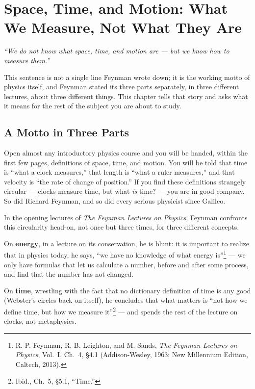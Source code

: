 \documentclass[12pt]{book}
\begin{document}
\chapter[Space, Time, and Motion]{Space, Time, and Motion: What We Measure, Not What They Are}
\label{ch:space-time-motion}

\begin{mottobox}
\noindent\textit{``We do not know what space, time, and motion are --- but we know how to measure them.''}

\vspace{4pt}
\noindent\small This sentence is not a single line Feynman wrote down; it is the working motto of physics itself, and Feynman stated its three parts separately, in three different lectures, about three different things. This chapter tells that story and asks what it means for the rest of the subject you are about to study.
\end{mottobox}

\section{A Motto in Three Parts}
\label{sec:motto-origins}

Open almost any introductory physics course and you will be handed, within the first few pages, definitions of space, time, and motion. You will be told that time is ``what a clock measures,'' that length is ``what a ruler measures,'' and that velocity is ``the rate of change of position.'' If you find these definitions strangely circular --- clocks measure time, but what \emph{is} time? --- you are in good company. So did Richard Feynman, and so did every serious physicist since Galileo.

In the opening lectures of \emph{The Feynman Lectures on Physics}, Feynman confronts this circularity head-on, not once but three times, for three different concepts.

On \textbf{energy}, in a lecture on its conservation, he is blunt: it is important to realize that in physics today, he says, ``we have no knowledge of what energy is''\footnote{R. P. Feynman, R. B. Leighton, and M. Sands, \emph{The Feynman Lectures on Physics}, Vol.~I, Ch.~4, \S4.1 (Addison-Wesley, 1963; New Millennium Edition, Caltech, 2013).} --- we only have formulas that let us calculate a number, before and after some process, and find that the number has not changed.

On \textbf{time}, wrestling with the fact that no dictionary definition of time is any good (Webster's circles back on itself), he concludes that what matters is ``not how we define time, but how we measure it''\footnote{Ibid., Ch.~5, \S5.1, ``Time.''} --- and spends the rest of the lecture on clocks, not metaphysics.
\end{document}

